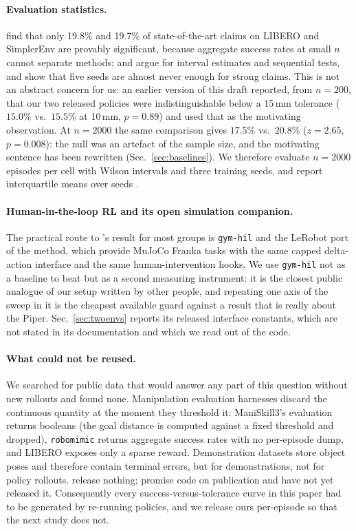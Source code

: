 \documentclass{article}
\begin{document}
\paragraph{Evaluation statistics.}
\citet{jiang2026benchmarking} find that only 19.8\% and 19.7\% of
state-of-the-art claims on LIBERO and SimplerEnv are provably significant,
because aggregate success rates at small $n$ cannot separate methods;
\citet{kressgazit2024empirical} and \citet{snyder2025step} argue for interval
estimates and sequential tests, and \citet{patterson2024empirical} show that
five seeds are almost never enough for strong claims. This is not an abstract
concern for us: an earlier version of this draft reported, from $n{=}200$, that
our two released policies were indistinguishable below a 15\,mm tolerance
($15.0\%$ vs.\ $15.5\%$ at 10\,mm, $p{=}0.89$) and used that as the motivating
observation. At $n{=}2000$ the same comparison gives $17.5\%$ vs.\ $20.8\%$
($z{=}2.65$, $p{=}0.008$): the null was an artefact of the sample size, and the
motivating sentence has been rewritten (Sec.~\ref{sec:baselines}). We therefore
evaluate $n{=}2000$ episodes per cell with Wilson intervals
\citep{wilson1927probable} and three training seeds, and report interquartile
means over seeds \citep{agarwal2021deep}.

\paragraph{Human-in-the-loop RL and its open simulation companion.}
The practical route to \citet{luo2025hilserl}'s result for most groups is
\texttt{gym-hil} \citep{gymhil2025} and the LeRobot port of the method, which
provide MuJoCo Franka tasks with the same capped delta-action interface and the
same human-intervention hooks. We use \texttt{gym-hil} not as a baseline to
beat but as a second measuring instrument: it is the closest public analogue of
our setup written by other people, and repeating one axis of the sweep in it is
the cheapest available guard against a result that is really about the Piper.
Sec.~\ref{sec:twoenvs} reports its released interface constants, which are not
stated in its documentation and which we read out of the code.

\paragraph{What could not be reused.}
We searched for public data that would answer any part of this question without
new rollouts and found none. Manipulation evaluation harnesses discard the
continuous quantity at the moment they threshold it: ManiSkill3's evaluation
returns booleans (the goal distance is computed against a fixed threshold and
dropped), \texttt{robomimic} returns aggregate success rates with no per-episode
dump, and LIBERO exposes only a sparse reward. Demonstration datasets store
object poses and therefore contain terminal errors, but for demonstrations, not
for policy rollouts. \citet{xu2026curse} release nothing;
\citet{feng2026demystifying} promise code on publication and have not yet
released it. Consequently every success-versus-tolerance curve in this paper had
to be generated by re-running policies, and we release ours per-episode so that
the next study does not.
\end{document}
